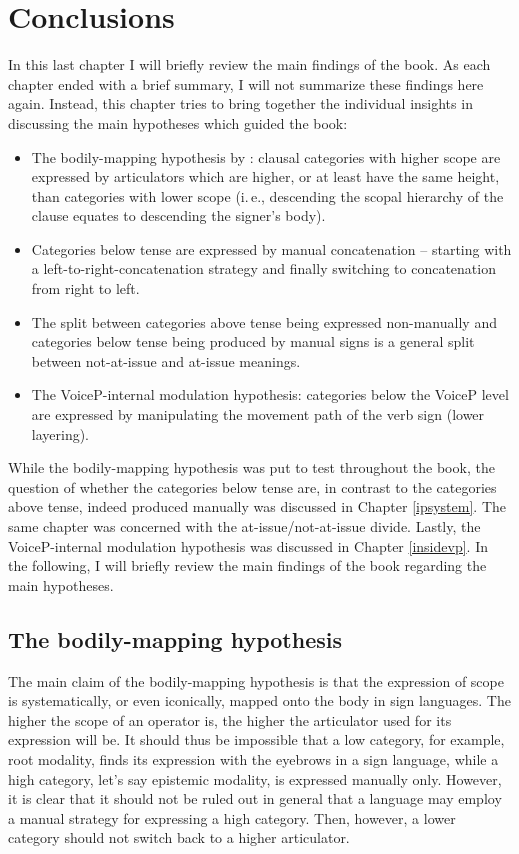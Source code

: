 \chapter{Conclusions}\label{chapterconclusions}
In this last chapter I will briefly review the main findings of the book. As each chapter ended with a brief summary, I will not summarize these findings here again. Instead, this chapter tries to bring together the individual insights in discussing the main hypotheses which guided the book:


\begin{itemize}[itemsep=0pt]
	\item The bodily-mapping hypothesis by \citet{bross2017scope}: clausal categories with higher scope are expressed by articulators which are higher, or at least have the same height, than categories with lower scope (i.\,e., descending the scopal hierarchy of the clause equates to descending the signer's body).
	\item Categories below tense are expressed by manual concatenation -- starting with a left-to-right-concatenation strategy and finally switching to concatenation from right to left.
	\item The split between categories above tense being expressed non-manually and categories below tense being produced by manual signs is a general split between not-at-issue and at-issue meanings.
	\item The VoiceP-internal modulation hypothesis: categories below the VoiceP level are expressed by manipulating the movement path of the verb sign (lower layering).
\end{itemize}

\noindent While the bodily-mapping hypothesis was put to test throughout the book, the question of whether the categories below tense are, in contrast to the categories above tense, indeed produced manually was discussed in Chapter \ref{ipsystem}. The same chapter was concerned with the at-issue/not-at-issue divide. Lastly, the VoiceP-internal modulation hypothesis was discussed in Chapter \ref{insidevp}. In the following, I will briefly review the main findings of the book regarding the main hypotheses.

\section{The bodily-mapping hypothesis}
The main claim of the bodily-mapping hypothesis is that the expression of scope is systematically, or even iconically, mapped onto the body in sign languages. The higher the scope of an operator is, the higher the articulator used for its expression will be. It should thus be impossible that a low category, for example, root modality, finds its expression with the eyebrows in a sign language, while a high category, let's say epistemic modality, is expressed manually only. However, it is clear that it should not be ruled out in general that a language may employ a manual strategy for expressing a high category. Then, however, a lower category should not switch back to a higher articulator. 

